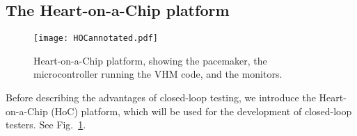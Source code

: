 \subsection{The Heart-on-a-Chip platform}
\label{HoC}

\begin{figure}[!t]
	\centering
	\texttt{[image: HOCannotated.pdf]}		
	\caption{\small Heart-on-a-Chip platform, showing the pacemaker, the microcontroller running the VHM code, and the monitors.}
	\label{fig:hoc}
\end{figure} 

Before describing the advantages of closed-loop testing, we introduce the Heart-on-a-Chip (HoC) platform, which will be used for the development of closed-loop testers.
See Fig.~\ref{fig:hoc}.
